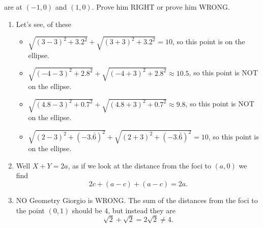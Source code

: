 \documentclass[nooutcomes,noauthor,handout]{ximera}
\begin{document}
\begin{question}
\begin{enumerate}
\begin{center}
      \end{center}
      are at $(-1,0)$ and $(1,0)$. Prove him RIGHT or prove him WRONG.
  \end{enumerate}
  \begin{freeResponse}
    \begin{enumerate}
    \item Let's see, of these
      \begin{itemize}
      \item $\sqrt{(3-3)^2+3.2^2} + \sqrt{(3+3)^2 + 3.2^2} = 10$, so this point is on the ellipse.
      \item $\sqrt{(-4-3)^2+2.8^2} + \sqrt{(-4+3)^2 + 2.8^2} \approx 10.5$, so this point is NOT on the ellipse.
      \item $\sqrt{(4.8-3)^2+0.7^2} + \sqrt{(4.8+3)^2 + 0.7^2} \approx 9.8$, so this point is NOT on the ellipse.
      \item $\sqrt{(2-3)^2+(-3.\bar{6})^2} + \sqrt{(2+3)^2 + (-3.\bar{6})^2} = 10$, so this point is on the ellipse.
      \end{itemize}
    \item Well $X+Y=2a$, as if we look at the distance from the foci to $(a,0)$ we find
      \[
      2c + (a-c) + (a-c) = 2a.
      \]
    \item NO Geometry Giorgio is WRONG. The sum of the distances from
      the foci to the point $(0,1)$ should be $4$, but instead they
      are
      \[
      \sqrt{2} + \sqrt{2} = 2\sqrt{2} \ne 4.
      \]
    \end{enumerate}
  \end{freeResponse}
\end{question}
\mynewpage
\end{document}
